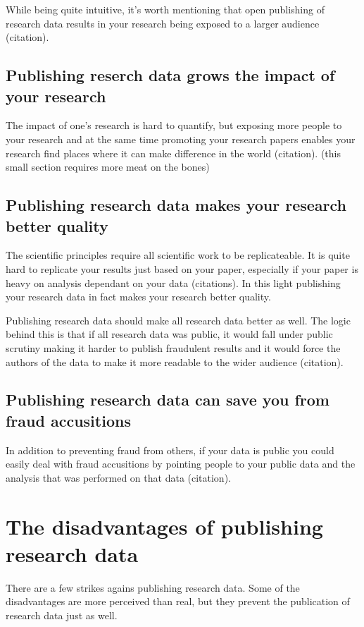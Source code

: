 While being quite intuitive, it's worth mentioning that open publishing of
research data results in your research being exposed to a larger audience
(citation).

\subsection{Publishing reserch data grows the impact of your research}

The impact of one's research is hard to quantify, but exposing more people to
your research and at the same time promoting your research papers enables your
research find places where it can make difference in the world (citation).
(this small section requires more meat on the bones)

\subsection{Publishing research data makes your research better quality}

The scientific principles require all scientific work to be replicateable. It
is quite hard to replicate your results just based on your paper, especially if
your paper is heavy on analysis dependant on your data (citations). In this
light publishing your research data in fact makes your research better quality.

Publishing research data should make all research data better as well. The
logic behind this is that if all research data was public, it would fall under
public scrutiny making it harder to publish fraudulent results and it would
force the authors of the data to make it more readable to the wider audience
(citation).

\subsection{Publishing research data can save you from fraud accusitions}

In addition to preventing fraud from others, if your data is public you could
easily deal with fraud accusitions by pointing people to your public data and
the analysis that was performed on that data (citation).

\section{The disadvantages of publishing research data}

There are a few strikes agains publishing research data. Some of the
disadvantages are more perceived than real, but they prevent the publication
of research data just as well.

